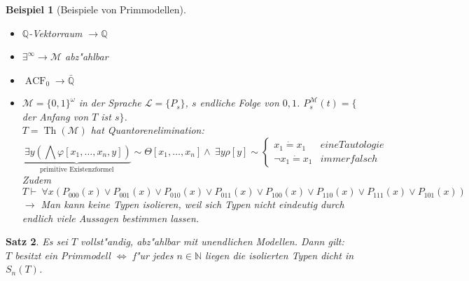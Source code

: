 \documentclass[a4paper,12pt,numbers=noenddot,parskip=full]{scrartcl}
\newcommand{\setN}{\mathbb{N}}
\newcommand{\setQ}{\mathbb{Q}}
\newcommand{\Forall}{~\forall}
\newcommand{\Exists}{~\exists}
\newcommand{\scrL}{\mathcal{L}}
\newcommand{\scrM}{\mathcal{M}}
\DeclareMathOperator{\acf}{ACF}
\DeclareMathOperator{\Th}{Th}
\theoremstyle{dotless}
\newtheorem{theorem}{Satz}[section]
\newtheorem{example}[theorem]{Beispiel}
\begin{document}
\begin{example}[Beispiele von Primmodellen]
	\begin{itemize}
		\item $\setQ$-Vektorraum $\longrightarrow \setQ$
		\item $\exists^\infty \longrightarrow \scrM$ abz"ahlbar
		\item $\acf_0 \longrightarrow \bar{\setQ}$
		\item $\scrM = \{0,1\}^\omega$ in der Sprache $\scrL = \{P_s\}$, $s$ endliche Folge von $0, 1$. $P_s^\scrM(t) = \{$der Anfang von $T$ ist $s\}$.\\
		$T = \Th(\scrM)$ hat Quantorenelimination: \begin{equation*}
			\underbrace{\Exists y \left(\bigwedge \varphi[x_1, \dots, x_n, y]\right)}_\text{primitive Existenzformel} \sim \Theta[x_1, \dots, x_n] \land \Exists y \rho[y] \sim \begin{cases*}
				x_1 \dot= x_1 &eine Tautologie\\
				\lnot x_1 \dot= x_1 &immer falsch
			\end{cases*}
		\end{equation*}
		Zudem \begin{equation*}
			T \vdash \Forall x (P_{000}(x) \lor P_{001}(x) \lor P_{010}(x) \lor P_{011}(x) \lor P_{100}(x) \lor P_{110}(x) \lor P_{111}(x) \lor P_{101}(x))
		\end{equation*}
		$\longrightarrow$ Man kann keine Typen isolieren, weil sich Typen nicht eindeutig durch endlich viele Aussagen bestimmen lassen.
	\end{itemize}
\end{example}
\begin{theorem}
	Es sei $T$ vollst"andig, abz"ahlbar mit unendlichen Modellen. Dann gilt: \\$T$ besitzt ein Primmodell $\Longleftrightarrow$ f"ur jedes $n \in \setN$ liegen die isolierten Typen dicht in $S_n(T)$.
\end{theorem}
\end{document}
